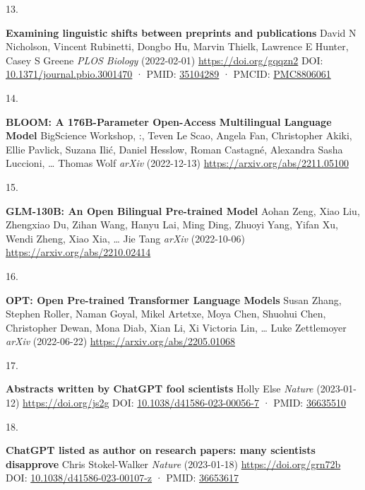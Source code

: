\documentclass[
]{article}
\newlength{\cslhangindent}
\newlength{\csllabelwidth}
\newlength{\cslentryspacingunit} %
\newenvironment{CSLReferences}[2] %
 {%
  \setlength{\parindent}{0pt}
  \ifodd #1
  \let\oldpar\par
  \def\par{\hangindent=\cslhangindent\oldpar}
  \fi
  \setlength{\parskip}{#2\cslentryspacingunit}
 }%
 {}
\newcommand{\CSLBlock}[1]{#1\hfill\break}
\newcommand{\CSLLeftMargin}[1]{\parbox[t]{\csllabelwidth}{#1}}
\newcommand{\CSLRightInline}[1]{\parbox[t]{\linewidth - \csllabelwidth}{#1}\break}
\begin{document}
\begin{CSLReferences}{0}{0}
\leavevmode{}%
\CSLLeftMargin{13. }%
\CSLRightInline{\textbf{Examining linguistic shifts between preprints and publications}
\CSLBlock{David N Nicholson, Vincent Rubinetti, Dongbo Hu, Marvin Thielk, Lawrence E Hunter, Casey S Greene} \emph{PLOS Biology} (2022-02-01) \url{https://doi.org/gqqzn2}
\CSLBlock{DOI: \href{https://doi.org/10.1371/journal.pbio.3001470}{10.1371/journal.pbio.3001470} · PMID: \href{https://www.ncbi.nlm.nih.gov/pubmed/35104289}{35104289} · PMCID: \href{https://www.ncbi.nlm.nih.gov/pmc/articles/PMC8806061}{PMC8806061}}}

\leavevmode{}%
\CSLLeftMargin{14. }%
\CSLRightInline{\textbf{BLOOM: A 176B-Parameter Open-Access Multilingual Language Model}
\CSLBlock{BigScience Workshop, :, Teven Le Scao, Angela Fan, Christopher Akiki, Ellie Pavlick, Suzana Ilić, Daniel Hesslow, Roman Castagné, Alexandra Sasha Luccioni, \ldots{} Thomas Wolf} \emph{arXiv} (2022-12-13) \url{https://arxiv.org/abs/2211.05100}}

\leavevmode{}%
\CSLLeftMargin{15. }%
\CSLRightInline{\textbf{GLM-130B: An Open Bilingual Pre-trained Model}
\CSLBlock{Aohan Zeng, Xiao Liu, Zhengxiao Du, Zihan Wang, Hanyu Lai, Ming Ding, Zhuoyi Yang, Yifan Xu, Wendi Zheng, Xiao Xia, \ldots{} Jie Tang} \emph{arXiv} (2022-10-06) \url{https://arxiv.org/abs/2210.02414}}

\leavevmode{}%
\CSLLeftMargin{16. }%
\CSLRightInline{\textbf{OPT: Open Pre-trained Transformer Language Models}
\CSLBlock{Susan Zhang, Stephen Roller, Naman Goyal, Mikel Artetxe, Moya Chen, Shuohui Chen, Christopher Dewan, Mona Diab, Xian Li, Xi Victoria Lin, \ldots{} Luke Zettlemoyer} \emph{arXiv} (2022-06-22) \url{https://arxiv.org/abs/2205.01068}}

\leavevmode{}%
\CSLLeftMargin{17. }%
\CSLRightInline{\textbf{Abstracts written by ChatGPT fool scientists}
\CSLBlock{Holly Else} \emph{Nature} (2023-01-12) \url{https://doi.org/js2g}
\CSLBlock{DOI: \href{https://doi.org/10.1038/d41586-023-00056-7}{10.1038/d41586-023-00056-7} · PMID: \href{https://www.ncbi.nlm.nih.gov/pubmed/36635510}{36635510}}}

\leavevmode{}%
\CSLLeftMargin{18. }%
\CSLRightInline{\textbf{ChatGPT listed as author on research papers: many scientists disapprove}
\CSLBlock{Chris Stokel-Walker} \emph{Nature} (2023-01-18) \url{https://doi.org/grn72b}
\CSLBlock{DOI: \href{https://doi.org/10.1038/d41586-023-00107-z}{10.1038/d41586-023-00107-z} · PMID: \href{https://www.ncbi.nlm.nih.gov/pubmed/36653617}{36653617}}}


\end{CSLReferences}
\end{document}
